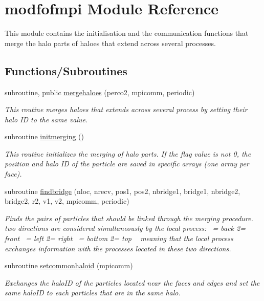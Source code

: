 \hypertarget{namespacemodfofmpi}{}\section{modfofmpi Module Reference}
\label{namespacemodfofmpi}


This module contains the initialisation and the communication functions that merge the halo parts of haloes that extend across several processes.  


\subsection*{Functions/\+Subroutines}
\begin{DoxyCompactItemize}
\item 
subroutine, public \hyperlink{namespacemodfofmpi_a8fbc997f93fd71798027bc6946d3bddb}{mergehaloes} (perco2, mpicomm, periodic)
\begin{DoxyCompactList}\small\item\em This routine merges haloes that extends across several process by setting their halo ID to the same value. \end{DoxyCompactList}\item 
subroutine \hyperlink{namespacemodfofmpi_ac5a219c1a82d90230bcb2b1260adc4b4}{initmerging} ()
\begin{DoxyCompactList}\small\item\em This routine initializes the merging of halo parts. If the flag value is not 0, the position and halo ID of the particle are saved in specific arrays (one array per face). \end{DoxyCompactList}\item 
subroutine \hyperlink{namespacemodfofmpi_ad3a945459cf7b001e4c4e51429eb8f31}{findbridge} (nloc, nrecv, pos1, pos2, nbridge1, bridge1, nbridge2, bridge2, r2, v1, v2, mpicomm, periodic)
\begin{DoxyCompactList}\small\item\em Finds the pairs of particles that should be linked through the merging procedure. ~\newline
 two directions are considered simultaneously by the local process\+: ~= back 2= front ~= left 2= right ~= bottom 2= top ~\newline
 meaning that the local process exchanges information with the processes located in these two directions. \end{DoxyCompactList}\item 
subroutine \hyperlink{namespacemodfofmpi_ae5663edf5a2902f952f8d6d3f5c4c8a5}{setcommonhaloid} (mpicomm)
\begin{DoxyCompactList}\small\item\em Exchanges the halo\+ID of the particles located near the faces and edges and set the same halo\+ID to each particles that are in the same halo. \end{DoxyCompactList}\end{DoxyCompactItemize}
